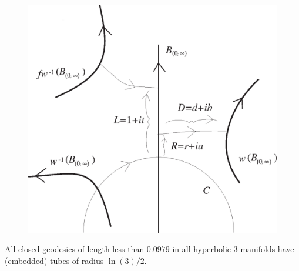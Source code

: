 \begin{figure}[ht]\label{GMT fig 1.1}
	\centering
	\includegraphics[scale=0.500]{fig1.1}
\end{figure}

\begin{proposition}\label{GMT prop1.10} All closed geodesics of length less than $0.0979$ in
all hyperbolic $3$\/{\textrm -}\/manifolds have {\textrm (}\/embedded\/{\textrm )} tubes of
radius $\ln(3)/2.$
\end{proposition}

